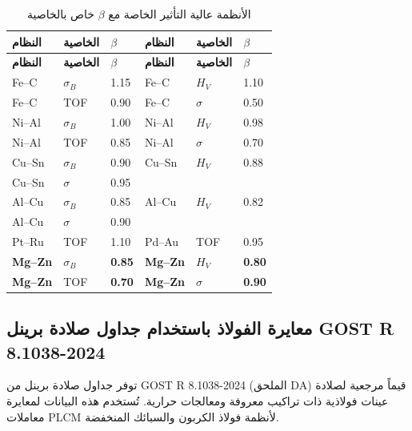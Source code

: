\documentclass[12pt,a4paper]{article}
\begin{document}
	\begin{longtable}{p{2.2cm} p{2.2cm} p{1.2cm} p{2.2cm} p{2.2cm} p{1.2cm}}
		\caption{الأنظمة عالية التأثير الخاصة مع \(\beta\) خاص بالخاصية}\label{tab:beta_special}\\
		\toprule
		\textbf{النظام} & \textbf{الخاصية} & \(\beta\) & \textbf{النظام} & \textbf{الخاصية} & \(\beta\) \\
		\midrule
		\endfirsthead
		\toprule
		\textbf{النظام} & \textbf{الخاصية} & \(\beta\) & \textbf{النظام} & \textbf{الخاصية} & \(\beta\) \\
		\midrule
		\endhead
		Fe–C  & \(\sigma_B\) & 1.15 & Fe–C  & \(H_V\) & 1.10 \\
		Fe–C  & TOF & 0.90 & Fe–C  & \(\sigma\) & 0.50 \\
		Ni–Al & \(\sigma_B\) & 1.00 & Ni–Al & \(H_V\) & 0.98 \\
		Ni–Al & TOF & 0.85 & Ni–Al & \(\sigma\) & 0.70 \\
		Cu–Sn & \(\sigma_B\) & 0.90 & Cu–Sn & \(H_V\) & 0.88 \\
		Cu–Sn & \(\sigma\) & 0.95 & & & \\
		Al–Cu & \(\sigma_B\) & 0.85 & Al–Cu & \(H_V\) & 0.82 \\
		Al–Cu & \(\sigma\) & 0.90 & & & \\
		Pt–Ru & TOF & 1.10 & Pd–Au & TOF & 0.95 \\
		\rowcolor{gray!10}
		\textbf{Mg–Zn} & \(\sigma_B\) & \textbf{0.85} & \textbf{Mg–Zn} & \(H_V\) & \textbf{0.80} \\
		\textbf{Mg–Zn} & TOF & \textbf{0.70} & \textbf{Mg–Zn} & \(\sigma\) & \textbf{0.90} \\
		\bottomrule
	\end{longtable}
	
	
	\subsection{معايرة الفولاذ باستخدام جداول صلادة برينل GOST R 8.1038-2024}
	\label{subsec:steel_calibration}
	
	توفر جداول صلادة برينل من GOST R 8.1038-2024 (الملحق DA) قيماً مرجعية لصلادة عينات فولاذية ذات تراكيب معروفة ومعالجات حرارية. تُستخدم هذه البيانات لمعايرة معاملات PLCM لأنظمة فولاذ الكربون والسبائك المنخفضة.
	
\end{document}
